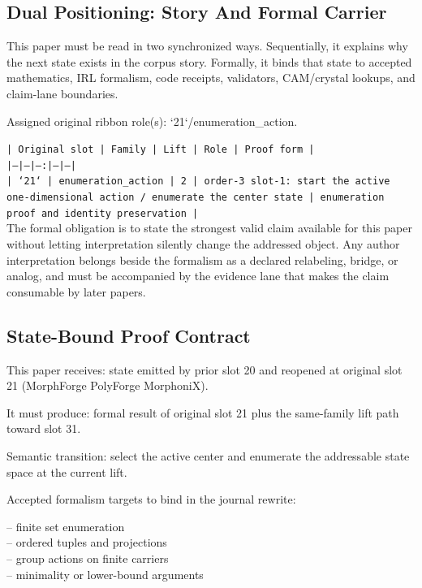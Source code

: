 \documentclass[11pt]{article}
\begin{document}
\subsection*{Dual Positioning: Story And Formal Carrier}

This paper must be read in two synchronized ways. Sequentially, it explains why
the next state exists in the corpus story. Formally, it binds that state to
accepted mathematics, IRL formalism, code receipts, validators, CAM/crystal
lookups, and claim-lane boundaries.

Assigned original ribbon role(s): `21`/enumeration\_action.

\noindent\texttt{| Original slot | Family | Lift | Role | Proof form |}\\
\noindent\texttt{|---|---|---:|---|---|}\\
\noindent\texttt{| `21` | enumeration\_action | 2 | order-3 slot-1: start the active one-dimensional action / enumerate the center state | enumeration proof and identity preservation |}\\

The formal obligation is to state the strongest valid claim available for this
paper without letting interpretation silently change the addressed object. Any
author interpretation belongs beside the formalism as a declared relabeling,
bridge, or analog, and must be accompanied by the evidence lane that makes the
claim consumable by later papers.

\subsection*{State-Bound Proof Contract}

This paper receives: state emitted by prior slot 20 and reopened at original slot 21 (MorphForge PolyForge MorphoniX).

It must produce: formal result of original slot 21 plus the same-family lift path toward slot 31.

Semantic transition: select the active center and enumerate the addressable state space at the current lift.

Accepted formalism targets to bind in the journal rewrite:

\noindent{}-- finite set enumeration\\
\noindent{}-- ordered tuples and projections\\
\noindent{}-- group actions on finite carriers\\
\noindent{}-- minimality or lower-bound arguments\\
\end{document}

